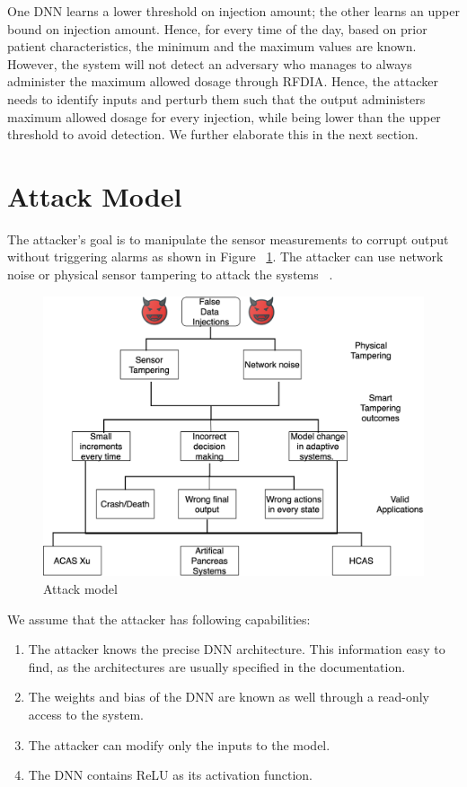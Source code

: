 One \ac{DNN} learns a lower threshold on injection amount; the other learns an upper bound on injection amount. 
Hence, for every time of the day, based on prior patient characteristics, the minimum and the maximum values are known. 
However, the system will not detect  an adversary  who manages to always administer the maximum allowed dosage through \ac{RFDIA}. 
Hence, the attacker needs to identify inputs and  perturb them  such that the output administers maximum allowed dosage for every injection,
  while being lower than the upper threshold to avoid detection. 
  We further elaborate this in the next section. 


\section{Attack Model}
The attacker's goal is to manipulate the sensor measurements to corrupt output without triggering alarms as shown in Figure ~\ref{fig:attackmodelphysical}. 
The attacker can use network noise or physical sensor tampering to attack the systems ~\cite{10.1145/3319535.3339815}.
 
\begin{figure}
	\centering
	\includegraphics[width=0.7\linewidth]{Images/Attackmodelphysical}
	\caption{Attack model}
	\label{fig:attackmodelphysical}
\end{figure}

We assume that the attacker has following capabilities:
\begin{enumerate}
	\item The attacker knows the precise \ac{DNN}  architecture. This information easy to find, as the architectures are  usually specified in the  documentation. 
	\item  The weights and bias of the \ac{DNN}  are known as well through a read-only access to the system.  
	\item The attacker can modify only the inputs to the model.
	\item The \ac{DNN} contains ReLU as its activation function. 
\end{enumerate}

